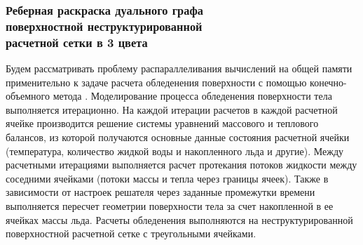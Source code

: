 


\subsubsection{Реберная раскраска дуального графа \\ поверхностной неструктурированной \\ расчетной сетки в 3 цвета}\label{sec:text_3_edge_coloring}

Будем рассматривать проблему распараллеливания вычислений на общей памяти применительно к задаче расчета обледенения поверхности с помощью конечно-объемного метода \cite{Gulicheva2024}.
Моделирование процесса обледенения поверхности тела выполняется итерационно.
На каждой итерации расчетов в каждой расчетной ячейке производится решение системы уравнений массового и теплового балансов, из которой получаются основные данные состояния расчетной ячейки (температура, количество жидкой воды и накопленного льда и другие).
Между расчетными итерациями выполняется расчет протекания потоков жидкости между соседними ячейками (потоки массы и тепла через границы ячеек).
Также в зависимости от настроек решателя через заданные промежутки времени выполняется пересчет геометрии поверхности тела за счет накопленной в ее ячейках массы льда.
Расчеты обледенения выполняются на неструктурированной поверхностной расчетной сетке с треугольными ячейками.


